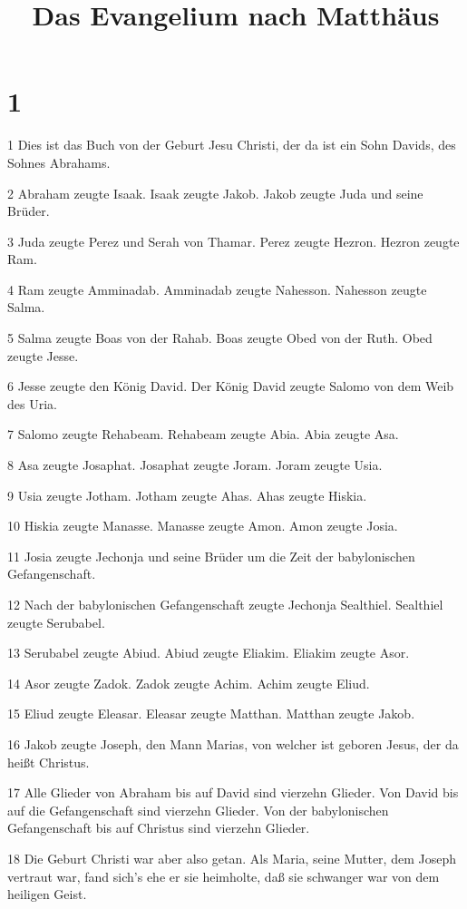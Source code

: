 

\title{Das Evangelium nach Matthäus}


\chapter{1}

\par 1 Dies ist das Buch von der Geburt Jesu Christi, der da ist ein Sohn Davids, des Sohnes Abrahams.
\par 2 Abraham zeugte Isaak. Isaak zeugte Jakob. Jakob zeugte Juda und seine Brüder.
\par 3 Juda zeugte Perez und Serah von Thamar. Perez zeugte Hezron. Hezron zeugte Ram.
\par 4 Ram zeugte Amminadab. Amminadab zeugte Nahesson. Nahesson zeugte Salma.
\par 5 Salma zeugte Boas von der Rahab. Boas zeugte Obed von der Ruth. Obed zeugte Jesse.
\par 6 Jesse zeugte den König David. Der König David zeugte Salomo von dem Weib des Uria.
\par 7 Salomo zeugte Rehabeam. Rehabeam zeugte Abia. Abia zeugte Asa.
\par 8 Asa zeugte Josaphat. Josaphat zeugte Joram. Joram zeugte Usia.
\par 9 Usia zeugte Jotham. Jotham zeugte Ahas. Ahas zeugte Hiskia.
\par 10 Hiskia zeugte Manasse. Manasse zeugte Amon. Amon zeugte Josia.
\par 11 Josia zeugte Jechonja und seine Brüder um die Zeit der babylonischen Gefangenschaft.
\par 12 Nach der babylonischen Gefangenschaft zeugte Jechonja Sealthiel. Sealthiel zeugte Serubabel.
\par 13 Serubabel zeugte Abiud. Abiud zeugte Eliakim. Eliakim zeugte Asor.
\par 14 Asor zeugte Zadok. Zadok zeugte Achim. Achim zeugte Eliud.
\par 15 Eliud zeugte Eleasar. Eleasar zeugte Matthan. Matthan zeugte Jakob.
\par 16 Jakob zeugte Joseph, den Mann Marias, von welcher ist geboren Jesus, der da heißt Christus.
\par 17 Alle Glieder von Abraham bis auf David sind vierzehn Glieder. Von David bis auf die Gefangenschaft sind vierzehn Glieder. Von der babylonischen Gefangenschaft bis auf Christus sind vierzehn Glieder.
\par 18 Die Geburt Christi war aber also getan. Als Maria, seine Mutter, dem Joseph vertraut war, fand sich's ehe er sie heimholte, daß sie schwanger war von dem heiligen Geist.
